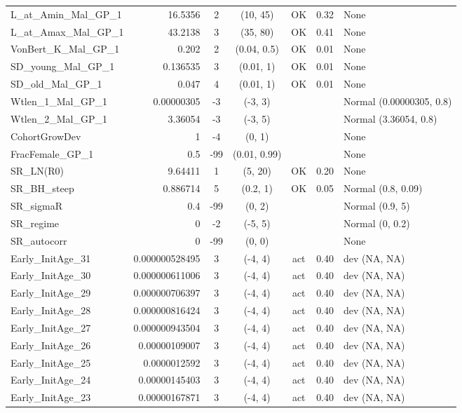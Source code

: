 \documentclass[12pt,]{article}
\begin{document}
\begin{landscape}
\begin{longtable}{lrcccll}
  L\_at\_Amin\_Mal\_GP\_1 & 16.5356 & 2 & (10, 45) & OK & 0.32 & None \\ 
  L\_at\_Amax\_Mal\_GP\_1 & 43.2138 & 3 & (35, 80) & OK & 0.41 & None \\ 
  VonBert\_K\_Mal\_GP\_1 & 0.202 & 2 & (0.04, 0.5) & OK & 0.01 & None \\ 
  SD\_young\_Mal\_GP\_1 & 0.136535 & 3 & (0.01, 1) & OK & 0.01 & None \\ 
  SD\_old\_Mal\_GP\_1 & 0.047 & 4 & (0.01, 1) & OK & 0.01 & None \\ 
  Wtlen\_1\_Mal\_GP\_1 & 0.00000305 & -3 & (-3, 3) &  &  & Normal (0.00000305, 0.8) \\ 
  Wtlen\_2\_Mal\_GP\_1 & 3.36054 & -3 & (-3, 5) &  &  & Normal (3.36054, 0.8) \\ 
  CohortGrowDev & 1 & -4 & (0, 1) &  &  & None \\ 
  FracFemale\_GP\_1 & 0.5 & -99 & (0.01, 0.99) &  &  & None \\ 
  SR\_LN(R0) & 9.64411 & 1 & (5, 20) & OK & 0.20 & None \\ 
  SR\_BH\_steep & 0.886714 & 5 & (0.2, 1) & OK & 0.05 & Normal (0.8, 0.09) \\ 
  SR\_sigmaR & 0.4 & -99 & (0, 2) &  &  & Normal (0.9, 5) \\ 
  SR\_regime & 0 & -2 & (-5, 5) &  &  & Normal (0, 0.2) \\ 
  SR\_autocorr & 0 & -99 & (0, 0) &  &  & None \\ 
  Early\_InitAge\_31 & 0.000000528495 & 3 & (-4, 4) & act & 0.40 & dev (NA, NA) \\ 
  Early\_InitAge\_30 & 0.000000611006 & 3 & (-4, 4) & act & 0.40 & dev (NA, NA) \\ 
  Early\_InitAge\_29 & 0.000000706397 & 3 & (-4, 4) & act & 0.40 & dev (NA, NA) \\ 
  Early\_InitAge\_28 & 0.000000816424 & 3 & (-4, 4) & act & 0.40 & dev (NA, NA) \\ 
  Early\_InitAge\_27 & 0.000000943504 & 3 & (-4, 4) & act & 0.40 & dev (NA, NA) \\ 
  Early\_InitAge\_26 & 0.00000109007 & 3 & (-4, 4) & act & 0.40 & dev (NA, NA) \\ 
  Early\_InitAge\_25 & 0.0000012592 & 3 & (-4, 4) & act & 0.40 & dev (NA, NA) \\ 
  Early\_InitAge\_24 & 0.00000145403 & 3 & (-4, 4) & act & 0.40 & dev (NA, NA) \\ 
  Early\_InitAge\_23 & 0.00000167871 & 3 & (-4, 4) & act & 0.40 & dev (NA, NA) \\ 

\end{longtable}
\end{landscape}
\end{document}
